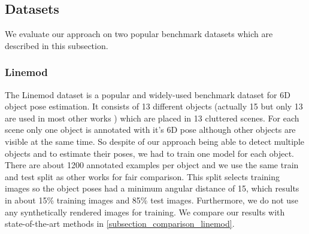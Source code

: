 \documentclass[twocolumn, 10pt, letterpaper]{article}
\begin{document}
\subsection{Datasets}
\label{subsection_datasets}
We evaluate our approach on two popular benchmark datasets which are described in this subsection.

\subsubsection{Linemod}
\label{subsubsection_linemod}
The Linemod\cite{Linemod} dataset is a popular and widely-used benchmark dataset for 6D object pose estimation. It consists of 13 different objects (actually 15 but only 13 are used in most other works \cite{YOLO6D}\cite{Pix2Pose}\cite{PVNet}\cite{DPOD}\cite{CDPN}\cite{HybridPose}) which are placed in 13 cluttered scenes. For each scene only one object is annotated with it's 6D pose although other objects are visible at the same time. So despite of our approach being able to detect multiple objects and to estimate their poses, we had to train one model for each object. There are about 1200 annotated examples per object and we use the same train and test split as other works \cite{Linemod_train_test_split}\cite{PVNet}\cite{YOLO6D} for fair comparison. This split selects training images so the object poses had a minimum angular distance of 15, which results in about 15\% training images and 85\% test images. Furthermore, we do not use any synthetically rendered images for training. We compare our results with state-of-the-art methods in \autoref{subsection_comparison_linemod}.
\end{document}
